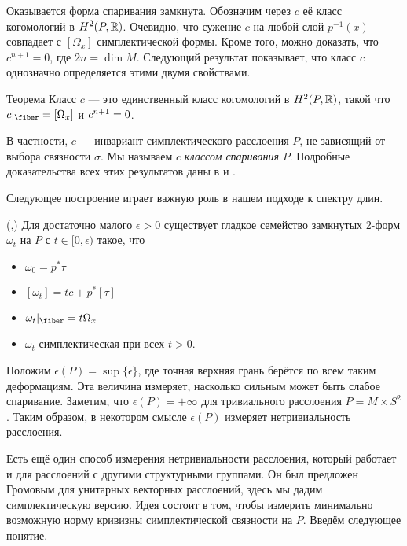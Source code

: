 Оказывается форма спаривания замкнута.
Обозначим через $c$ её класс когомологий в $H^2 (P, \mathbb{R})$.
Очевидно, что сужение $c$ на любой слой $p^{-1}(x)$ совпадает с
 $[\Omega_x]$
симплектической формы.  
Кроме того, можно доказать, что $c^{n+1} = 0$, где $2n = \dim M$.
Следующий результат показывает, что класс $c$ однозначно определяется
этими двумя свойствами. 

\begin{thm}{Теорема}\label{9.3.A}
  Класс $c$ --- это единственный класс когомологий в $H^2 (P, \mathbb{R})$,
  такой что $c|_{\fiber} = [\Omega_x]$ и $c^{n+1} \z= 0$.
\end{thm}

В частности, $c$ --- инвариант симплектического расслоения $P$, не
зависящий от выбора связности $\sigma$. 
Мы называем $c$ \emph{классом спаривания} $P$.
Подробные доказательства всех этих результатов даны в \cite{GLS} и \cite{MS}.

Следующее построение играет важную роль в нашем подходе к спектру длин.

(\cite{GLS},\cite{MS})
Для достаточно малого $\epsilon > 0$ существует гладкое семейство
замкнутых 2-форм $\omega_t$ на $P$ с $t \in [0, \epsilon)$ такое, что 
\begin{itemize}
\item $\omega_0 = p^\ast \tau$
\item $[\omega_t] = tc + p^\ast [\tau]$
\item $\omega_t|_{\fiber} = t\Omega_x$
\item $\omega_t$ симплектическая при всех $t > 0$.
\end{itemize}

Положим $\epsilon(P) = \sup \{\epsilon\}$, где точная верхняя грань
берётся по всем таким деформациям. 
Эта величина измеряет, насколько сильным может быть слабое спаривание.
Заметим, что $\epsilon(P) = +\infty$ для тривиального расслоения $P =
M \times S^2$.
Таким образом, в некотором смысле $\epsilon(P)$ измеряет
нетривиальность расслоения.

Есть ещё один способ измерения нетривиальности расслоения, который
работает и для расслоений с другими структурными группами.
Он был предложен Громовым \cite{G2} для унитарных векторных
расслоений, здесь мы дадим симплектическую версию.
Идея состоит в том, чтобы измерить минимально возможную норму кривизны
симплектической связности на $P$.
Введём следующее понятие.

